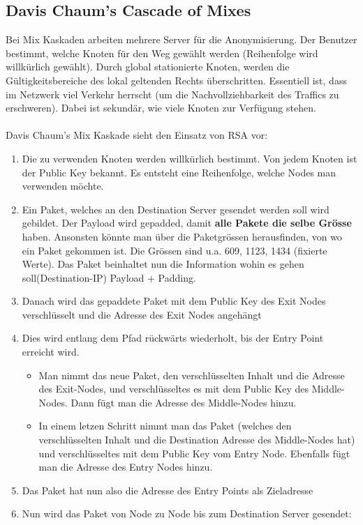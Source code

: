 \subsection{Davis Chaum's Cascade of Mixes}
Bei Mix Kaskaden arbeiten mehrere Server für die Anonymisierung. Der Benutzer bestimmt, welche Knoten für den Weg gewählt werden (Reihenfolge wird willkürlich gewählt). Durch global stationierte Knoten, werden die Gültigkeitsbereiche des lokal geltenden Rechts überschritten. Essentiell ist, dass im Netzwerk viel Verkehr herrscht (um die Nachvollziehbarkeit des Traffics zu erschweren). Dabei ist sekundär, wie viele Knoten zur Verfügung stehen.  \\
\\
Davis Chaum's Mix Kaskade sieht den Einsatz von RSA vor:
\begin{enumerate}
	\item Die zu verwenden Knoten werden willkürlich bestimmt. Von jedem Knoten ist der Public Key bekannt. Es entsteht eine Reihenfolge, welche Nodes man verwenden möchte.
	\item Ein Paket, welches an den Destination Server gesendet werden soll wird gebildet. 
	Der Payload wird gepadded, damit \textbf{alle Pakete die selbe Grösse} haben. Ansonsten könnte man über die Paketgrössen herausfinden, von wo ein Paket gekommen ist. Die Grössen sind u.a. 609, 1123, 1434 (fixierte Werte). Das Paket beinhaltet nun die Information wohin es gehen soll(Destination-IP) Payload + Padding.
	\item Danach wird das gepaddete Paket mit dem Public Key des Exit Nodes verschlüsselt und die Adresse des Exit Nodes angehängt
	\item Dies wird entlang dem Pfad rückwärts wiederholt, bis der Entry Point erreicht wird. 
	\begin{itemize}
	    \item Man nimmt das neue Paket, den verschlüsselten Inhalt und die Adresse des Exit-Nodes, und verschlüsseltes es mit dem Public Key des Middle-Nodes. Dann fügt man die Adresse des Middle-Nodes hinzu.
	    \item In einem letzen Schritt nimmt man das Paket (welches den verschlüsselten Inhalt und die Destination Adresse des Middle-Nodes hat) und verschlüsseltes mit dem Public Key vom Entry Node.
	    Ebenfalls fügt man die Adresse des Entry Nodes hinzu.
	\end{itemize}
	\item Das Paket hat nun also die Adresse des Entry Points als Zieladresse
	\item Nun wird das Paket von Node zu Node bis zum Destination Server gesendet:

\end{enumerate}
